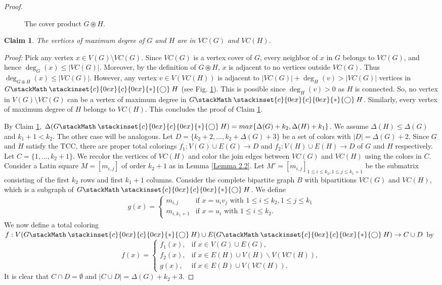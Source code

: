 \documentclass[12pt]{article}
\newcommand\oast{\stackMath\mathbin{\stackinset{c}{0ex}{c}{0ex}{\ast}{\bigcirc}}}
\theoremstyle{definition}
\newtheorem{claim}{Claim}
\begin{document}
\begin{proof}
\begin{figure}[ht]
\begin{tikzpicture}[scale=1]
    \end{tikzpicture}
    \caption{The cover product $G \circledast H$.}
    \label{Figure 5}
\end{figure}


\begin{claim}\label{Claim 6}
{\em The vertices of maximum degree of $G$ and $H$ are in $VC(G)$ and $VC(H)$.}
\end{claim}

\textit{Proof:}
Pick any vertex $x \in V(G) \setminus VC(G)$. Since $VC(G)$ is a vertex cover of $G$, every neighbor of $x$ in $G$ belongs to $VC(G)$, and hence $\deg_G(x) \le |VC(G)|$. Moreover, by the definition of $G \circledast H$, $x$ is adjacent to no vertices outside $VC(G)$. Thus $\deg_{G \circledast H}(x) \le |VC(G)|$.
However, any vertex $v\in V(VC(H))$ is adjacent to $|VC(G)|+\deg_{H}(v)>|VC(G)|$ vertices in $G\oast H$ (see Fig. \ref{Figure 5}). This is possible since $\deg_{H}(v)>0$ as $H$ is connected.
So, no vertex in $V(G)\setminus VC(G)$ can be a vertex of
maximum degree in $G\oast H$. 
Similarly, every vertex of maximum degree
of $H$ belongs to $VC(H)$.
This concludes the proof of Claim \ref{Claim 6}.

By Claim \ref{Claim 6}, $\Delta(G\oast H)= max \{\Delta(G)+k_2, \Delta(H)+k_1\}$.
We assume $\Delta(H)\leq \Delta(G)$ and $k_1+1<k_2$. 
The other case will be analogous.
Let $D=\{k_2+2,...,k_2+\Delta(G)+3\}$ be a set of colors with $|D| = \Delta(G) + 2$. 
Since $G$ and $H$ satisfy the TCC, there are proper total colorings $f_1 : V(G)\cup E(G) \to D$ and $f_2 : V(H)\cup E(H) \to D$ of $G$ and $H$ respectively. 
Let $C=\{1,...,k_2+1\}$. 
We recolor the vertices of $VC(H)$ and color the join edges between
$VC(G)$ and $VC(H)$ using the colors in $C$. Consider a Latin square $M=[m_{i,j}]$ of order $k_2+1$ 
as in Lemma \ref{Lemma 2.2}. 
Let $M'=[m_{i,j}]_{1\leq i\leq k_2,1\leq j\leq k_1+1}$ be the submatrix consisting of the first $k_2$ rows and first $k_1+1$ columns.
Consider the complete bipartite graph $B$ with bipartitions $VC(G)$ and $VC(H)$, which is a subgraph of $G \oast H$. We define
\begin{align*}
g(x)=
\begin{cases}
m_{i,j} & \text{if } x=u_iv_j \text{ with }  1\leq i \leq k_2, 1\leq j \leq k_1 \\[2mm]
m_{i, k_1+1} & \text{if } x=u_i \text{ with } 1\leq i \leq k_2.
\end{cases}
\end{align*}
We now define a total coloring $f:V(G\oast H)\cup E(G\oast H)\rightarrow C\cup D$ by
\[
f(x)=
\begin{cases}
f_1(x), & \text{if } x\in V(G)\cup E(G),\\
f_2(x), & \text{if } x\in E(H)\cup V(H)\backslash V(VC(H)),\\
g(x), & \text{if } x\in E(B)\cup V(VC(H)).
\end{cases}
\]
It is clear that $C\cap D=\emptyset$ and $|C\cup D|=\Delta(G)+k_2+3$.


\end{proof}
\end{document}
